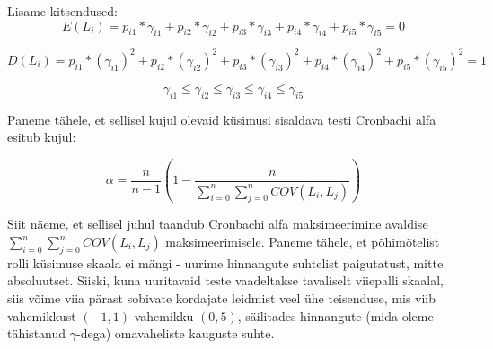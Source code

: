 \documentclass[a4paper]{article}
\begin{document}
Lisame kitsendused:
\begin{equation}
E(L_i) = p_{i1}*\gamma_{i1}+p_{i2}*\gamma_{i2}+p_{i3}*\gamma_{i3}+
p_{i4}*\gamma_{i4}+p_{i5}*\gamma_{i5}=0
\end{equation}

\begin{equation}
D(L_i) = 
p_{i1}*(\gamma_{i1})^2+ p_{i2}*(\gamma_{i2})^2 + p_{i3}*(\gamma_{i3})^2 + p_{i4}*(\gamma_{i4})^2 + p_{i5}*(\gamma_{i5})^2 = 1 
\end{equation}

\begin{equation}
\gamma_{i1} \leq \gamma_{i2}  \leq \gamma_{i3} \leq \gamma_{i4} \leq \gamma_{i5}
\end{equation}


Paneme tähele, et sellisel kujul olevaid k\"usimusi sisaldava testi Cronbachi alfa esitub kujul:

\begin{equation}
\alpha = \frac{n}{n-1}\left(1 - \frac
{n}{\sum \limits_{i=0}^n \sum \limits_{j=0}^n COV(L_i,L_j)}\right)
\end{equation}

Siit näeme, et sellisel juhul taandub Cronbachi alfa maksimeerimine avaldise $\sum \limits_{i=0}^n \sum \limits_{j=0}^n COV(L_i,L_j)$ maksimeerimisele. Paneme tähele, et põhimõtelist rolli k\"usimuse skaala ei mängi - uurime hinnangute suhtelist paigutatust, mitte absoluutset. Siiski, kuna uuritavaid teste vaadeltakse tavaliselt viiepalli skaalal, siis võime viia pärast sobivate kordajate leidmist veel \"uhe teisenduse, mis viib vahemikkust $(-1,1)$ vahemikku $(0,5)$, säilitades hinnangute (mida oleme tähistanud $\gamma$-dega) omavaheliste kauguste suhte.
\end{document}
